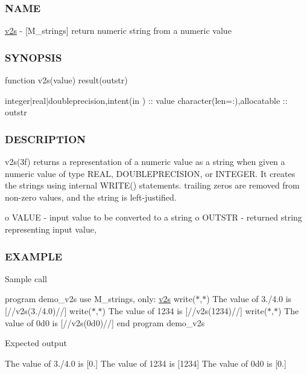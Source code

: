 \subsubsection*{N\+A\+ME}

\hyperlink{interfacem__strings_1_1v2s}{v2s} -\/ \mbox{[}M\+\_\+strings\mbox{]} return numeric string from a numeric value \subsubsection*{S\+Y\+N\+O\+P\+S\+IS}

function v2s(value) result(outstr)

integer$\vert$real$\vert$doubleprecision,intent(in ) \+:\+: value character(len=\+:),allocatable \+:\+: outstr \subsubsection*{D\+E\+S\+C\+R\+I\+P\+T\+I\+ON}

\begin{DoxyVerb}v2s(3f) returns a representation of a numeric value as a string when
given a numeric value of type REAL, DOUBLEPRECISION, or INTEGER. It
creates the strings using internal WRITE() statements.  trailing zeros
are removed from non-zero values, and the string is left-justified.

   o  VALUE - input value to be converted to a string
   o  OUTSTR - returned string representing input value,
\end{DoxyVerb}
 \subsubsection*{E\+X\+A\+M\+P\+LE}

Sample call

program demo\+\_\+v2s use M\+\_\+strings, only\+: \hyperlink{interfacem__strings_1_1v2s}{v2s} write($\ast$,$\ast$) \textquotesingle{}The value of 3./4.0 is \mbox{[}\textquotesingle{}//v2s(3./4.0)//\textquotesingle{}\mbox{]}\textquotesingle{} write($\ast$,$\ast$) \textquotesingle{}The value of 1234 is \mbox{[}\textquotesingle{}//v2s(1234)//\textquotesingle{}\mbox{]}\textquotesingle{} write($\ast$,$\ast$) \textquotesingle{}The value of 0d0 is \mbox{[}\textquotesingle{}//v2s(0d0)//\textquotesingle{}\mbox{]}\textquotesingle{} end program demo\+\_\+v2s

Expected output

The value of 3./4.0 is \mbox{[}0.\mbox{]} The value of 1234 is \mbox{[}1234\mbox{]} The value of 0d0 is \mbox{[}0.\mbox{]}

